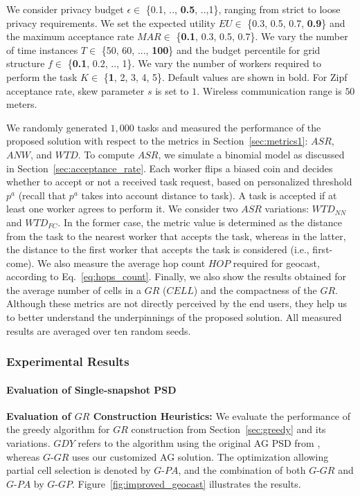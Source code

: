 \documentclass{USC-Thesis}
\renewcommand\bf\bfseries  %
\numberwithin{equation}{chapter}
\begin{document}
We consider privacy budget $\epsilon \in$ \{0.1, .., {\bf 0.5}, ..,1\}, ranging from strict to loose privacy requirements. We set the expected utility $\mathit{EU} \in$ \{0.3, 0.5, 0.7, {\bf 0.9}\} and the maximum acceptance rate $\mathit{MAR}\in$ \{{\bf 0.1}, 0.3, 0.5, 0.7\}. We vary the number of time instances $T\in$ \{50, 60, ..., {\bf 100}\} and the budget percentile for grid structure $f\in$ \{{\bf 0.1}, 0.2, .., 1\}. We vary the number of workers required to perform the task $K\in$ \{{\bf 1}, 2, 3, 4, 5\}. Default values are shown in bold. For Zipf acceptance rate, skew parameter $s$ is set to $1$. Wireless communication range is $50$ meters.

We randomly generated $1,000$ tasks and measured the performance of the proposed solution with respect to the metrics in Section~\ref{sec:metrics1}: $\mathit{ASR}$, $\mathit{ANW}$, and $\mathit{WTD}$. 
To compute $\mathit{ASR}$, we simulate a binomial model as discussed in Section~\ref{sec:acceptance_rate}. Each worker flips a biased coin and decides whether to accept or not a received task request, based on personalized threshold $p^a$ (recall that $p^a$ takes into account distance to task).
A task is accepted if at least one worker agrees to perform it.
We consider two $\mathit{ASR}$ variations: $\mathit{WTD_{NN}}$ and $\mathit{WTD_{FC}}$. In the former case, the metric value is determined as the distance from the task to the nearest worker that accepts the task, whereas in the latter, the distance to the first worker that accepts the task is considered (i.e., first-come).
We also measure the average hop count $\mathit{HOP}$ required for geocast, according to Eq.~\eqref{eq:hops_count}.
Finally, we also show the results obtained for the average number of cells in a $\mathit{GR}$ ($\mathit{CELL}$) and the compactness of the $\mathit{GR}$. Although these metrics are not directly perceived by the end users, they help us to better understand the underpinnings of the proposed solution.
All measured results are averaged over ten random seeds.


\subsubsection{Experimental Results}

\paragraph{Evaluation of Single-snapshot PSD}

\textbf{Evaluation of $\mathit{GR}$ Construction Heuristics:}
We evaluate the performance of the greedy algorithm for $\mathit{GR}$ construction from Section~\ref{sec:greedy} and its variations. $\mathit{GDY}$ refers to the algorithm using the original AG PSD from \cite{qardaji2012differentially}, whereas $G$-$\mathit{GR}$ uses our customized AG solution. The optimization allowing partial cell selection is denoted by $G$-$\mathit{PA}$, and the combination of both $G$-$\mathit{GR}$ and $G$-$\mathit{PA}$ by $G$-$\mathit{GP}$. Figure~\ref{fig:improved_geocast} illustrates the results.
\end{document}
